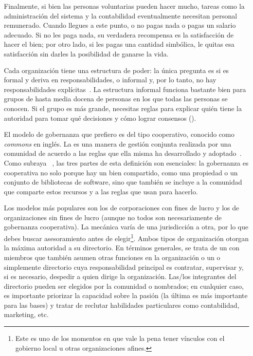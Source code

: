 Finalmente,
si bien  las personas voluntarias pueden hacer mucho,
tareas como la administración del sistema y la contabilidad eventualmente necesitan personal remunerado.
Cuando llegues a este punto, o no pagas nada o pagas un salario adecuado.
Si no les paga nada, su verdadera recompensa es la satisfacción de hacer el bien;
por otro lado, si les pagas una cantidad simbólica, le quitas esa satisfacción sin darles la posibilidad de ganarse la vida.


Cada organización tiene una estructura de poder:
la única pregunta es si es formal y deriva en responsabilidades, o informal y, por lo tanto, no hay responsabilidades explícitas~\cite{Free1972}.
La estructura informal funciona bastante bien para grupos de hasta media docena de personas
en los que todas las personas se conocen.
Si el grupo es más grande,
necesitas reglas para explicar
quién tiene la autoridad para tomar qué decisiones
y cómo lograr consensos ().

El modelo de gobernanza que prefiero es del tipo cooperativo, conocido como \emph{commons} en inglés. La  es una manera de gestión conjunta realizada por una comunidad
de acuerdo a las reglas que ella misma ha desarrollado y adoptado~\cite{Ostr2015}.
Como subraya ~\cite{Boll2014}, las tres partes de esta definición son esenciales:
la gobernanza es cooperativa no solo porque hay un bien compartido, como una propiedad o un conjunto de bibliotecas de software,
sino que también se incluye a la comunidad que comparte estos recursos y a las reglas que usan para hacerlo.

Los modelos más populares son los de corporaciones con fines de lucro y 
los de organizaciones sin fines de lucro (aunque no todos son necesariamente de gobernanza cooperativa).
La mecánica varía de una jurisdicción a otra,
por lo que debes buscar asesoramiento antes de elegir\footnote{
  Este es uno de los momentos
  en que vale la pena tener vínculos con el gobierno local u otras organizaciones afines.}.
Ambos tipos de organización otorgan la máxima autoridad a su directorio.
En términos generales, se trata de un 
con miembros que también asumen otras funciones en la organización
o un  o simplemente directorio cuya 
responsabilidad principal es contratar, supervisar
y, si es necesario, despedir a quien dirige la organización.
Las/los integrantes del directorio pueden ser elegidos por la comunidad o nombrados;
en cualquier caso, es importante priorizar la capacidad sobre la pasión
(la última es más importante para las bases)
y tratar de reclutar habilidades particulares como contabilidad, marketing, etc.

